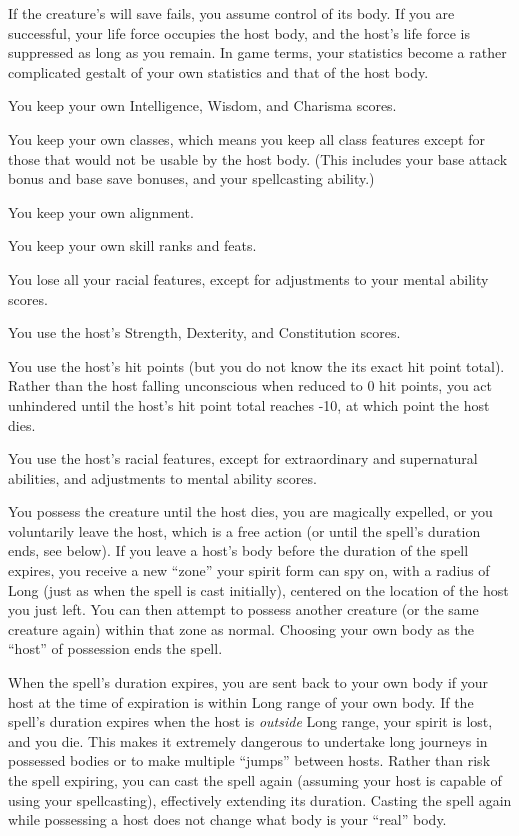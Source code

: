 If the creature's will save fails, you assume control of its body.
If you are successful, your life force occupies the host body, and the host's life force is suppressed as long as you remain.
In game terms, your statistics become a rather complicated gestalt of your own statistics and that of the host body.
\begin{list}{}{\leftmargin=1em}
 \item You keep your own Intelligence, Wisdom, and Charisma scores.
 \item You keep your own classes, 
 which means you keep all class features except for those that would not be usable by the host body.
 (This includes your base attack bonus and base save bonuses, and your spellcasting ability.)
 \item You keep your own alignment.
 \item You keep your own skill ranks and feats.
 \item You lose all your racial features, except for adjustments to your mental ability scores.
 \item You use the host's Strength, Dexterity, and Constitution scores.
 \item You use the host's hit points (but you do not know the its exact hit point total).
 Rather than the host falling unconscious when reduced to 0 hit points,
 you act unhindered until the host's hit point total reaches -10, at which point the host dies.
 \item You use the host's racial features, except for extraordinary and supernatural abilities, and adjustments to mental ability scores.
\end{list}
You possess the creature until the host dies, you are magically expelled, or you voluntarily leave the host, which is a free action 
(or until the spell's duration ends, see below).
If you leave a host's body before the duration of the spell expires, you receive a new ``zone'' your spirit form can spy on, with a radius of Long
(just as when the spell is cast initially), centered on the location of the host you just left. 
You can then attempt to possess another creature (or the same creature again) within that zone as normal.
Choosing your own body as the ``host'' of possession ends the spell.

When the spell's duration expires, you are sent back to your own body if your host at the time of expiration is within Long range of your own body.
If the spell's duration expires when the host is \emph{outside} Long range, your spirit is lost, and you die. This makes it extremely dangerous
to undertake long journeys in possessed bodies or to make multiple ``jumps'' between hosts. Rather than risk the spell expiring, you can cast the spell
again (assuming your host is capable of using your spellcasting), effectively extending its duration. Casting the spell again while possessing a host
does not change what body is your ``real'' body.

